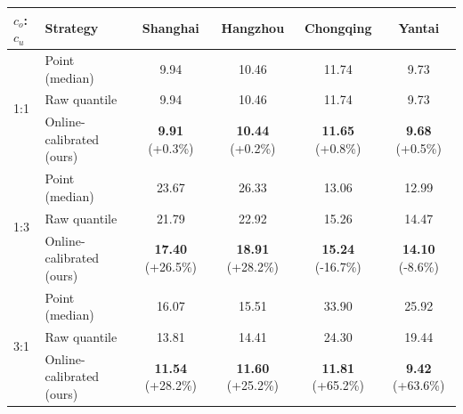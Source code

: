 \begin{tabular}{llcccc}
\toprule
$c_o$:$c_u$ & Strategy & Shanghai & Hangzhou & Chongqing & Yantai \\
\midrule
\multirow{3}{*}{1:1} & Point (median) & 9.94 & 10.46 & 11.74 & 9.73 \\
 & Raw quantile & 9.94 & 10.46 & 11.74 & 9.73 \\
 & Online-calibrated (ours) & \textbf{9.91} (+0.3\%) & \textbf{10.44} (+0.2\%) & \textbf{11.65} (+0.8\%) & \textbf{9.68} (+0.5\%) \\
\midrule
\multirow{3}{*}{1:3} & Point (median) & 23.67 & 26.33 & 13.06 & 12.99 \\
 & Raw quantile & 21.79 & 22.92 & 15.26 & 14.47 \\
 & Online-calibrated (ours) & \textbf{17.40} (+26.5\%) & \textbf{18.91} (+28.2\%) & \textbf{15.24} (-16.7\%) & \textbf{14.10} (-8.6\%) \\
\midrule
\multirow{3}{*}{3:1} & Point (median) & 16.07 & 15.51 & 33.90 & 25.92 \\
 & Raw quantile & 13.81 & 14.41 & 24.30 & 19.44 \\
 & Online-calibrated (ours) & \textbf{11.54} (+28.2\%) & \textbf{11.60} (+25.2\%) & \textbf{11.81} (+65.2\%) & \textbf{9.42} (+63.6\%) \\
\bottomrule
\end{tabular}
